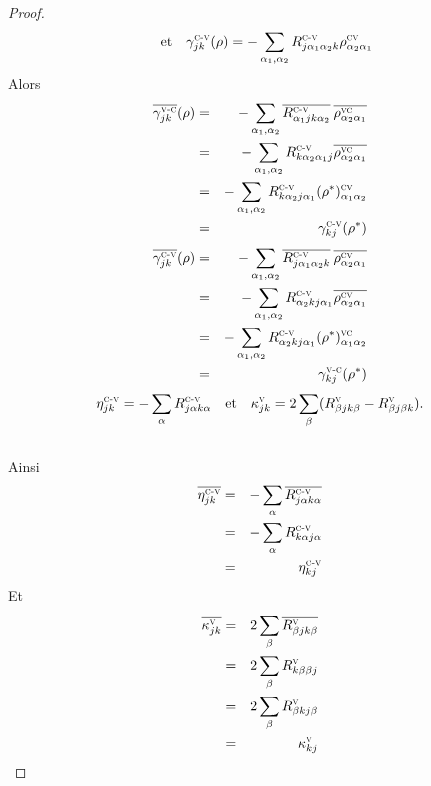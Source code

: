 \documentclass[12pt,a4paper,openany,oneside]{book}
\begin{document}
{{{{{{\begin{proof}
$$\quad
\textrm{et} 
\quad
\gamma^{\textsc{c-v}}_{jk}(\rho) = -\displaystyle\sum_{\alpha_{1},\alpha_{2}}R^{\textsc{c-v}}_{j\alpha_{1}\alpha_{2}k}\rho^{\textsc{cv}}_{\alpha_{2}\alpha_{1}}
$$  
%
Alors 
\begin{eqnarray*}
\overline{\gamma^{\textsc{v-c}}_{jk}}(\rho) & = & -\displaystyle\sum_{\alpha_{1},\alpha_{2}}\overline{R^{\textsc{c-v}}_{\alpha_{1}jk\alpha_{2}}}\:\overline{\rho^{\textsc{vc}}_{\alpha_{2}\alpha_{1}}}\\
& = & -\displaystyle\sum_{\alpha_{1},\alpha_{2}}R^{\textsc{c-v}}_{k\alpha_{2}\alpha_{1}j}\overline{\rho^{\textsc{vc}}_{\alpha_{2}\alpha_{1}}}\\
& = & -\displaystyle\sum_{\alpha_{1},\alpha_{2}}R^{\textsc{c-v}}_{k\alpha_{2}j\alpha_{1}}(\rho^{*})^{\textsc{cv}}_{\alpha_{1}\alpha_{2}}\\
& = & \gamma^{\textsc{c-v}}_{kj}(\rho^{*})
\end{eqnarray*} 
\begin{eqnarray*}
\overline{\gamma^{\textsc{c-v}}_{jk}}(\rho) & = & -\displaystyle\sum_{\alpha_{1},\alpha_{2}}\overline{R^{\textsc{c-v}}_{j\alpha_{1}\alpha_{2}k}}\:\overline{\rho^{\textsc{cv}}_{\alpha_{2}\alpha_{1}}}\\
& = & -\displaystyle\sum_{\alpha_{1},\alpha_{2}}R^{\textsc{c-v}}_{\alpha_{2}kj\alpha_{1}}\overline{\rho^{\textsc{cv}}_{\alpha_{2}\alpha_{1}}}\\
& = & -\displaystyle\sum_{\alpha_{1},\alpha_{2}}R^{\textsc{c-v}}_{\alpha_{2}kj\alpha_{1}}(\rho^{*})^{\textsc{vc}}_{\alpha_{1}\alpha_{2}}\\
& = & \gamma^{\textsc{v-c}}_{kj}(\rho^{*})
\end{eqnarray*} 
$$ \eta^{\textsc{c-v}}_{jk}=-\displaystyle\sum_{\alpha}R^{\textsc{c-v}}_{j \alpha k \alpha} 
\quad \mathrm{et}\quad \kappa^{\textsc{v}}_{jk}=2\displaystyle\sum_{\beta}(R^{\textsc{v}}_{\beta jk \beta}-R^{\textsc{v}}_{\beta j \beta k}).$$\\
Ainsi 
\begin{eqnarray*}
   \overline{\eta^{\textsc{c-v}}_{jk}} & = & -\displaystyle\sum_{\alpha}\overline{R^{\textsc{c-v}}_{j \alpha k \alpha}}\\
                            & = & -\displaystyle\sum_{\alpha}R^{\textsc{c-v}}_{k\alpha j\alpha}\\                  
                            & = & \eta^{\textsc{c-v}}_{kj}
  \end{eqnarray*}
  Et 
\begin{eqnarray*}
  \overline{\kappa^{\textsc{v}}_{jk}} & = & 2\displaystyle\sum_{\beta}\overline{R^{\textsc{v}}_{\beta jk \beta}}\\
                            & = & 2\displaystyle\sum_{\beta}{R^{\textsc{v}}_{k \beta \beta j}}\\
                            & = & 2\displaystyle\sum_{\beta}{R^{\textsc{v}}_{\beta kj\beta}}\\
                            & = & \kappa^{\textsc{v}}_{kj}
  \end{eqnarray*}
  


\end{proof}}}}}}}
\end{document}
